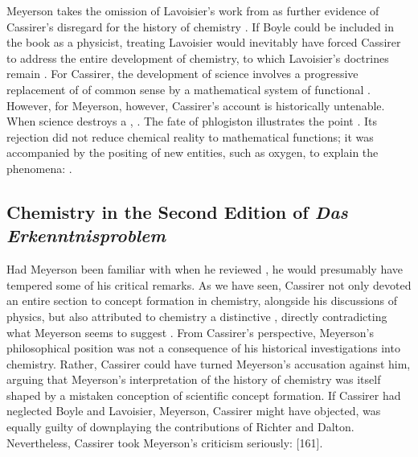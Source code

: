 \documentclass[submitted,12pt]{article}
\begin{document}
Meyerson takes the omission of Lavoisier's work from \EPt as further evidence of Cassirer's disregard for the history of chemistry \citep[103]{Meyerson1911}.  If Boyle could be included in the book as a physicist, treating Lavoisier would inevitably have forced Cassirer to address the entire development of chemistry, to which Lavoisier's doctrines remain  \citep[103]{Meyerson1911}. For Cassirer, the development of science involves a progressive replacement of  of common sense by a mathematical system of functional . However, for Meyerson, however, Cassirer's account is historically untenable. When science destroys a ,   \citep[129]{Meyerson1911}. The fate of phlogiston illustrates the point \citep[see][203]{Meyerson1908}. Its rejection did not reduce chemical reality to mathematical functions; it was accompanied by the positing of new entities, such as oxygen, to explain the phenomena:  \citep[129]{Meyerson1911}. 

\subsection{Chemistry in the Second Edition of \emph{Das Erkenntnisproblem}}
%
Had Meyerson been familiar with \SFt when he reviewed \EPt, he would presumably have tempered some of his critical remarks. As we have seen, Cassirer not only devoted an entire section to concept formation in chemistry, alongside his discussions of physics, but also attributed to chemistry a distinctive , directly contradicting what Meyerson seems to suggest . From Cassirer's perspective, Meyerson's philosophical position was not a consequence of his historical investigations into chemistry. Rather, Cassirer could have turned Meyerson's accusation against him, arguing that Meyerson's interpretation of the history of chemistry was itself shaped by a mistaken conception of scientific concept formation. If Cassirer had neglected Boyle and Lavoisier, Meyerson, Cassirer might have objected, was equally guilty of downplaying the contributions of Richter and Dalton. Nevertheless, Cassirer took Meyerson's criticism seriously:  [161].
\end{document}
